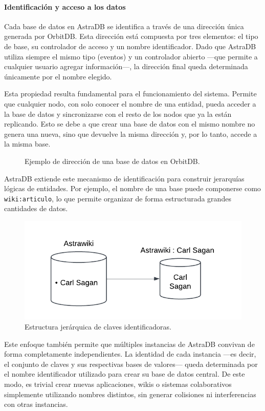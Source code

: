 \paragraph{Identificación y acceso a los datos}

Cada base de datos en AstraDB se identifica a través de una dirección única generada por OrbitDB. Esta dirección está compuesta por tres elementos: el tipo de base, su controlador de acceso y un nombre identificador. Dado que AstraDB utiliza siempre el mismo tipo (eventos) y un controlador abierto —que permite a cualquier usuario agregar información—, la dirección final queda determinada únicamente por el nombre elegido.

Esta propiedad resulta fundamental para el funcionamiento del sistema. Permite que cualquier nodo, con solo conocer el nombre de una entidad, pueda acceder a la base de datos y sincronizarse con el resto de los nodos que ya la están replicando. Esto se debe a que crear una base de datos con el mismo nombre no genera una nueva, sino que devuelve la misma dirección y, por lo tanto, accede a la misma base.



\begin{figure}[H]
\centering
{}
\caption{Ejemplo de dirección de una base de datos en OrbitDB.}
\end{figure}

AstraDB extiende este mecanismo de identificación para construir jerarquías lógicas de entidades. Por ejemplo, el nombre de una base puede componerse como \texttt{wiki:articulo}, lo que permite organizar de forma estructurada grandes cantidades de datos.

\begin{figure}[H]
\centering
\includegraphics[width=0.6\linewidth]{img/solucion-ipfs/bdd-names.png}
\caption{Estructura jerárquica de claves identificadoras.}
\label{fig:bdd-names}
\end{figure}

Este enfoque también permite que múltiples instancias de AstraDB convivan de forma completamente independientes. La identidad de cada instancia —es decir, el conjunto de claves y sus respectivas bases de valores— queda determinada por el nombre identificador utilizado para crear su base de datos central. De este modo, es trivial crear nuevas aplicaciones, wikis o sistemas colaborativos simplemente utilizando nombres distintos, sin generar colisiones ni interferencias con otras instancias.

